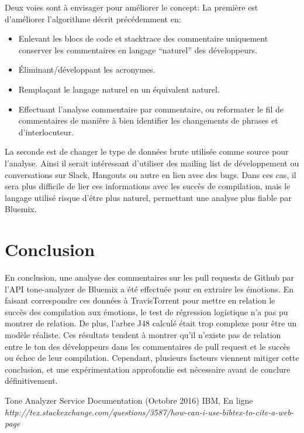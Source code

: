 \documentclass[10pt, conference]{IEEEtran}
\begin{document}
Deux voies sont à envisager pour améliorer le concept:
La première est d’améliorer l’algorithme décrit précédemment en:
\begin{itemize}
\item Enlevant les blocs de code et stacktrace des commentaire uniquement conserver les commentaires en langage “naturel” des développeurs.
\item Éliminant/développant les acronymes.
\item Remplaçant le langage naturel en un équivalent naturel.
\item Effectuant l’analyse commentaire par commentaire, ou reformater le fil de commentaires de manière à bien identifier les changements de phrases et d’interlocuteur.
\end{itemize}
La seconde est de changer le type de données brute utilisée comme source pour l’analyse. Ainsi il serait intéressant d’utiliser des mailing list de développement ou conversations sur Slack, Hangouts ou autre en lien avec des bugs. Dans ces cas, il sera plus difficile de lier ces informations avec les succès de compilation, mais le langage utilisé risque d’être plus naturel, permettant une analyse plus fiable par Bluemix.


\section{Conclusion}
\label{sec:conclusion}

En conclusion, une analyse des commentaires sur les pull requests de Github par l'API tone-analyzer de Bluemix a été effectuée pour en extraire les émotions. En faisant correspondre ces données à TravisTorrent pour mettre en relation le succès des compilation aux émotions, le test de régression logistique n'a pas pu montrer de relation. De plus, l'arbre J48 calculé était trop complexe pour être un modèle réaliste. Ces résultats tendent à montrer qu'il n'existe pas de relation entre le ton des développeurs dans les commentaires de pull request et le succès ou échec de leur compilation. Cependant, plusieurs facteurs viennent mitiger cette conclusion, et une expérimentation approfondie est nécessaire avant de conclure définitivement. 


\begin{thebibliography}{1}
 Tone Analyzer Service Documentation (Octobre 2016) IBM, En ligne \emph{http://tex.stackexchange.com/questions/3587/how-can-i-use-bibtex-to-cite-a-web-page} 
\end{thebibliography}
\end{document}
